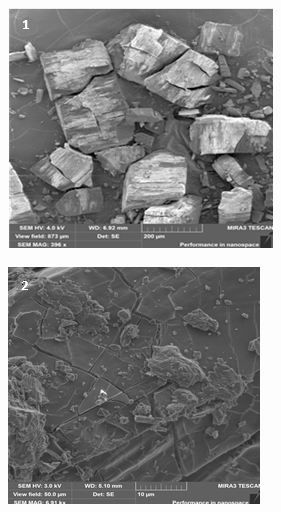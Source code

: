 \begin{figure}[H]
    \centering
    \begin{subfigure}[b]{0.32\textwidth}
        \centering
        \includegraphics[height=0.9\textwidth]{assets/45}
    \end{subfigure}
    \hfill
    \begin{subfigure}[b]{0.32\textwidth}
        \centering
        \includegraphics[height=0.9\textwidth]{assets/46}

\end{subfigure}
\end{figure}
